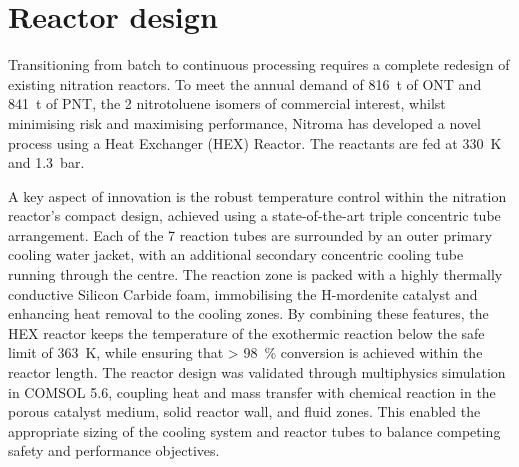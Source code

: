 \section*{Reactor design}
Transitioning from batch to continuous processing requires a complete redesign of existing nitration reactors. To meet the annual demand of \SI{816}{\tonne} of ONT and \SI{841}{\tonne} of PNT, the 2 nitrotoluene isomers of commercial interest, whilst minimising risk and maximising performance, Nitroma has developed a novel process using a Heat Exchanger (HEX) Reactor. The reactants are fed at \SI{330}{\K} and \SI{1.3}{bar}.

A key aspect of innovation is the robust temperature control within the nitration reactor's compact design, achieved using a state-of-the-art triple concentric tube arrangement. Each of the 7 reaction tubes are surrounded by an outer primary cooling water jacket, with an additional secondary concentric cooling tube running through the centre. The reaction zone is packed with a highly thermally conductive Silicon Carbide foam, immobilising the H-mordenite catalyst and enhancing heat removal to the cooling zones. By combining these features, the HEX reactor keeps the temperature of the exothermic reaction below the safe limit of \SI{363}{\K}, while ensuring that \SI{> 98}{\percent} conversion is achieved within the reactor length. The reactor design was validated through multiphysics simulation in COMSOL 5.6, coupling heat and mass transfer with chemical reaction in the porous catalyst medium, solid reactor wall, and fluid zones. This enabled the appropriate sizing of the cooling system and reactor tubes to balance competing safety and performance objectives.


